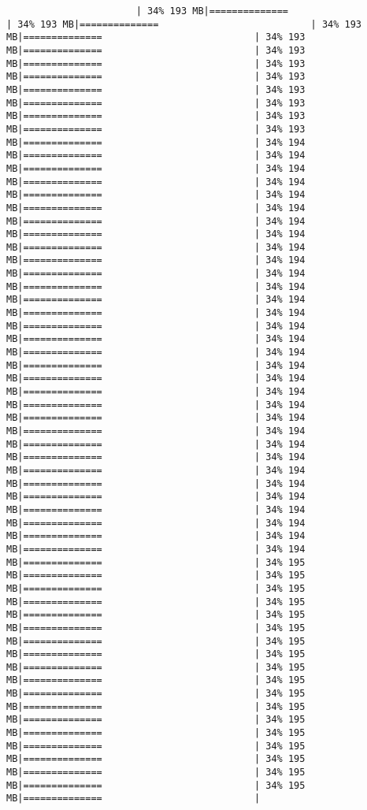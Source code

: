 \documentclass[
]{article}
\begin{document}
\begin{verbatim}
                       | 34% 193 MB|==============                           | 34% 193 MB|==============                           | 34% 193 MB|==============                           | 34% 193 MB|==============                           | 34% 193 MB|==============                           | 34% 193 MB|==============                           | 34% 193 MB|==============                           | 34% 193 MB|==============                           | 34% 193 MB|==============                           | 34% 193 MB|==============                           | 34% 193 MB|==============                           | 34% 194 MB|==============                           | 34% 194 MB|==============                           | 34% 194 MB|==============                           | 34% 194 MB|==============                           | 34% 194 MB|==============                           | 34% 194 MB|==============                           | 34% 194 MB|==============                           | 34% 194 MB|==============                           | 34% 194 MB|==============                           | 34% 194 MB|==============                           | 34% 194 MB|==============                           | 34% 194 MB|==============                           | 34% 194 MB|==============                           | 34% 194 MB|==============                           | 34% 194 MB|==============                           | 34% 194 MB|==============                           | 34% 194 MB|==============                           | 34% 194 MB|==============                           | 34% 194 MB|==============                           | 34% 194 MB|==============                           | 34% 194 MB|==============                           | 34% 194 MB|==============                           | 34% 194 MB|==============                           | 34% 194 MB|==============                           | 34% 194 MB|==============                           | 34% 194 MB|==============                           | 34% 194 MB|==============                           | 34% 194 MB|==============                           | 34% 194 MB|==============                           | 34% 194 MB|==============                           | 34% 194 MB|==============                           | 34% 194 MB|==============                           | 34% 195 MB|==============                           | 34% 195 MB|==============                           | 34% 195 MB|==============                           | 34% 195 MB|==============                           | 34% 195 MB|==============                           | 34% 195 MB|==============                           | 34% 195 MB|==============                           | 34% 195 MB|==============                           | 34% 195 MB|==============                           | 34% 195 MB|==============                           | 34% 195 MB|==============                           | 34% 195 MB|==============                           | 34% 195 MB|==============                           | 34% 195 MB|==============                           | 34% 195 MB|==============                           | 34% 195 MB|==============                           | 34% 195 MB|==============                           | 34% 195 MB|==============                           | 
\end{verbatim}
\end{document}
